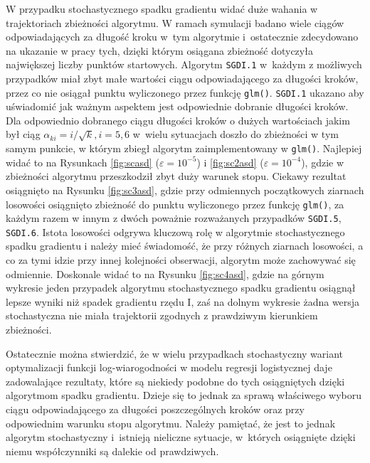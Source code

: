 W przypadku stochastycznego spadku gradientu widać duże wahania w trajektoriach zbieżności algorytmu. W ramach symulacji badano wiele ciągów odpowiadających za długość kroku w~tym algorytmie i~ostatecznie zdecydowano na ukazanie w pracy tych, dzięki którym osiągana zbieżność dotyczyła największej liczby punktów startowych. Algorytm \texttt{SGDI.1} w~każdym z możliwych przypadków miał zbyt małe wartości ciągu odpowiadającego za długości kroków, przez co nie osiągał punktu wyliczonego przez funkcję \texttt{glm()}. \texttt{SGDI.1} ukazano aby uświadomić jak ważnym aspektem jest odpowiednie dobranie długości kroków. Dla odpowiednio dobranego ciągu długości kroków o dużych wartościach jakim był ciąg $\alpha_{ki} = i/\sqrt{k}, i = 5, 6$ w~wielu sytuacjach doszło do zbieżności w tym samym punkcie, w którym zbiegł algorytm zaimplementowany w \texttt{glm()}. Najlepiej widać to na Rysunkach \ref{fig:scasd} ($\varepsilon = 10^{-5}$) i \ref{fig:sc2asd} ($\varepsilon = 10^{-4}$), gdzie w zbieżności algorytmu przeszkodził zbyt duży warunek stopu. Ciekawy rezultat osiągnięto na Rysunku \ref{fig:sc3asd}, gdzie przy odmiennych początkowych ziarnach losowości osiągnięto zbieżność do punktu wyliczonego przez funkcję \texttt{glm()}, za każdym razem w innym z dwóch poważnie rozważanych przypadków \texttt{SGDI.5}, \texttt{SGDI.6}. Istota losowości odgrywa kluczową rolę w algorytmie stochastycznego spadku gradientu i należy mieć świadomość, że przy różnych ziarnach losowości, a co za tymi idzie przy innej kolejności obserwacji, algorytm może zachowywać się odmiennie. Doskonale widać to na Rysunku \ref{fig:sc4asd}, gdzie na górnym wykresie jeden przypadek algorytmu stochastycznego spadku gradientu osiągnął lepsze wyniki niż spadek gradientu rzędu I, zaś na dolnym wykresie żadna wersja stochastyczna nie miała trajektorii zgodnych z prawdziwym kierunkiem zbieżności.

Ostatecznie można stwierdzić, że w wielu przypadkach stochastyczny wariant optymalizacji funkcji log-wiarogodności w modelu regresji logistycznej daje zadowalające rezultaty, które są niekiedy podobne do tych osiągniętych dzięki algorytmom spadku gradientu. Dzieje się to jednak za sprawą właściwego wyboru ciągu odpowiadającego za długości poszczególnych kroków oraz przy odpowiednim warunku stopu algorytmu. Należy pamiętać, że jest to jednak algorytm stochastyczny i~istnieją nieliczne sytuacje, w~których osiągnięte dzięki niemu współczynniki są dalekie od prawdziwych.



